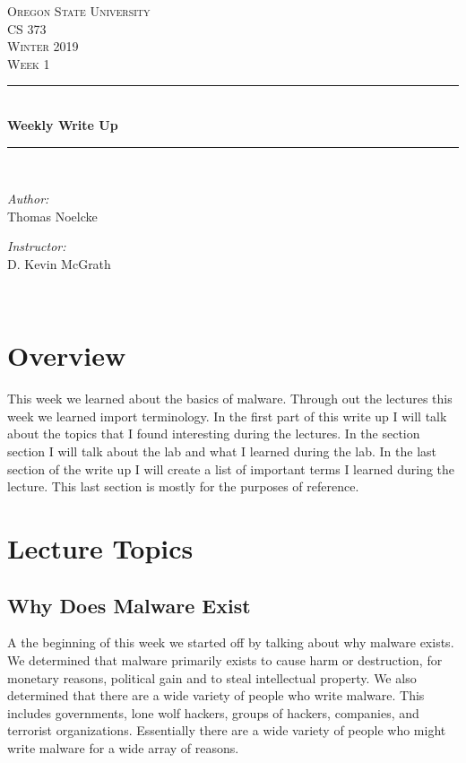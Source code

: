 \documentclass[letterpaper, onecolumn,10pt]{IEEEtran}
\begin{document}
    \begin{titlepage}
    \newcommand{\HRule}{\rule{\linewidth}{0.5mm}}
    \center
    \textsc{\Large Oregon State University}\\[1.5cm]
    \textsc{\Large CS 373}\\[0.5cm]
    \textsc{\Large Winter 2019}\\[0.5cm]
    \textsc{\Large Week 1}\\[0.5cm]
    \HRule \\[0.4cm]
    { \huge \bfseries Weekly Write Up}\\[0.4cm] %
    \HRule \\[1.5cm]
    \begin{minipage}{0.4\textwidth}
        \begin{flushleft} \large
        \emph{Author:}\\
        Thomas Noelcke
        \end{flushleft}
    \end{minipage}
    \begin{minipage}{0.4\textwidth}
        \begin{flushright} \large
        \emph{Instructor:} \\
        D. Kevin McGrath\\
        \end{flushright}
    \end{minipage}\\[2cm]
		\end{titlepage}
		
		
		\section{Overview}
		    This week we learned about the basics of malware. Through out the lectures this week we learned import terminology. In the first part of this write up I will talk about the topics that I found interesting during the lectures. In the section section I will talk about the lab and what I learned during the lab. In the last section of the write up I will create a list of important terms I learned during the lecture. This last section is mostly for the purposes of reference.\\
		
		\section{Lecture Topics}
		    \subsection{Why Does Malware Exist} A the beginning of this week we started off by talking about why malware exists. We determined that malware primarily exists to cause harm or destruction, for monetary reasons, political gain and to steal intellectual property. We also determined that there are a wide variety of people who write malware. This includes governments, lone wolf hackers, groups of hackers, companies, and terrorist organizations. Essentially there are a wide variety of people who might write malware for a wide array of reasons.\\
		    
\end{document}
